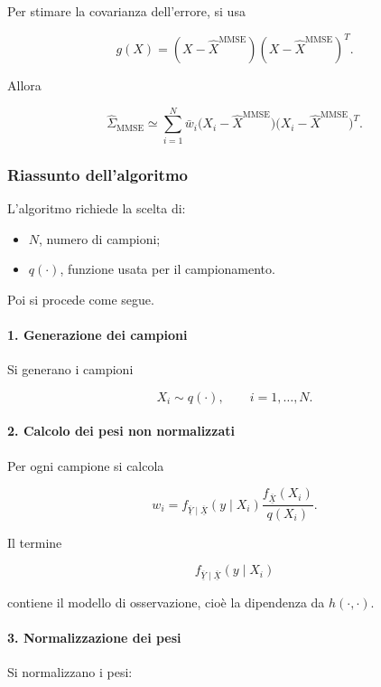 \documentclass[11pt,a4paper]{article}
\begin{document}
Per stimare la covarianza dell'errore, si usa

\[
g(X)
=
(X-\hat X^{\mathrm{MMSE}})
(X-\hat X^{\mathrm{MMSE}})^T.
\]

Allora

\[
\hat\Sigma_{\mathrm{MMSE}}
\simeq
\sum_{i=1}^{N}
\bar w_i
\bigl(X_i-\hat X^{\mathrm{MMSE}}\bigr)
\bigl(X_i-\hat X^{\mathrm{MMSE}}\bigr)^T.
\]

\subsubsection*{Riassunto dell'algoritmo}

L'algoritmo richiede la scelta di:

\begin{itemize}
    \item \(N\), numero di campioni;
    \item \(q(\cdot)\), funzione usata per il campionamento.
\end{itemize}

Poi si procede come segue.

\paragraph{1. Generazione dei campioni}

Si generano i campioni

\[
X_i\sim q(\cdot),
\qquad i=1,\dots,N.
\]

\paragraph{2. Calcolo dei pesi non normalizzati}

Per ogni campione si calcola

\[
w_i
=
f_{\overline{\underline{Y}}\mid \overline{\underline{X}}}(y\mid X_i)
\frac{f_{\overline{\underline{X}}}(X_i)}{q(X_i)}.
\]

Il termine

\[
f_{\overline{\underline{Y}}\mid \overline{\underline{X}}}(y\mid X_i)
\]

contiene il modello di osservazione, cioè la dipendenza da \(h(\cdot,\cdot)\).

\paragraph{3. Normalizzazione dei pesi}

Si normalizzano i pesi:
\end{document}
